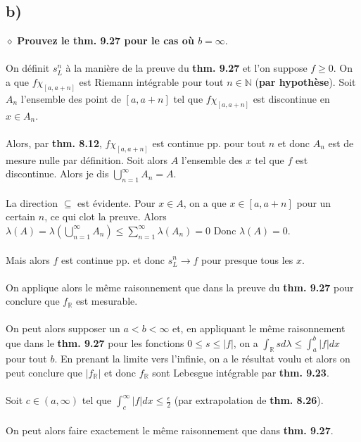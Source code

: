 \documentclass[a4paper,10pt]{article}
\begin{document}
\subsection*{b)}
$\diamond$ \textbf{Prouvez le thm. 9.27 pour le cas où $b = \infty.$}
\\
\\
On définit $s_L^n$ à la manière de la preuve du \textbf{thm. 9.27} et l'on suppose $f \geq 0$. On a que $f \chi_{[a,a+n]}$ est Riemann intégrable pour tout $n \in \mathbb{N}$ (\textbf{par hypothèse}). Soit $A_n$ l'ensemble des point de $[a,a+n]$ tel que $f \chi_{[a,a+n]}$ est discontinue en $x \in A_n$.
\\
\\
Alors, par \textbf{thm. 8.12}, $f \chi_{[a,a+n]}$ est continue pp. pour tout $n$ et donc $A_n$ est de mesure nulle par définition. Soit alors $A$ l'ensemble des $x$ tel que $f$ est discontinue. Alors je dis $\bigcup_{n=1}^\infty A_n = A$.
\\
\\
La direction $\subseteq$ est évidente. Pour $x \in A$, on a que $x \in [a,a+n]$ pour un certain $n$, ce qui clot la preuve. Alors $\lambda (A) = \lambda \left( \bigcup_{n=1}^\infty A_n \right) \leq \sum_{n=1}^\infty \lambda (A_n) = 0$ Donc $\lambda (A) = 0$.
\\
\\
Mais alors $f$ est continue pp. et donc $s_L^n \rightarrow f$ pour presque tous les $x$. 
\\
\\
On applique alors le même raisonnement que dans la preuve du \textbf{thm. 9.27} pour conclure que $f_\mathbb{R}$ est mesurable.
\\
\\
On peut alors supposer un $a < b < \infty$ et, en appliquant le même raisonnement que dans le \textbf{thm. 9.27} pour les fonctions $0 \leq s \leq |f|$, on a $\int_\mathbb{R} s d\lambda \leq \int_a^b |f| dx$ pour tout $b$. En prenant la limite vers l'infinie, on a le résultat voulu et alors on peut conclure que $|f_\mathbb{R}|$ et donc $f_\mathbb{R}$ sont Lebesgue intégrable par \textbf{thm. 9.23}.
\\
\\
Soit $c \in (a, \infty)$ tel que $\int_c^\infty |f| dx \leq \frac{\epsilon}{2}$ (par extrapolation de \textbf{thm. 8.26}). 
\\
\\
On peut alors faire exactement le même raisonnement que dans \textbf{thm. 9.27}.
\end{document}
